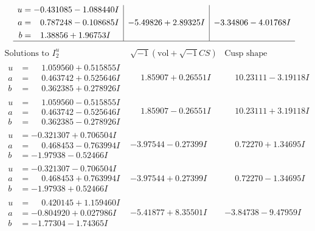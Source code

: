 \documentclass[1p]{elsarticle_modified}
\theoremstyle{definition}
\newcommand{\I}{\sqrt{-1}}
\begin{document}
$$\begin{array}{c|c|c}
\begin{aligned}
u &= -0.431085 - 1.088440 I \\
a &= \phantom{-}0.787248 - 0.108685 I \\
b &= \phantom{-}1.38856 + 1.96753 I\end{aligned}
 & -5.49826 + 2.89325 I & -3.34806 - 4.01768 I\\
 \hline 
 \end{array}$$\newpage$$\begin{array}{c|c|c}  
\text{Solutions to }I^u_{2}& \I (\text{vol} + \sqrt{-1}CS) & \text{Cusp shape}\\
 \hline 
\begin{aligned}
u &= \phantom{-}1.059560 + 0.515855 I \\
a &= \phantom{-}0.463742 + 0.525646 I \\
b &= \phantom{-}0.362385 + 0.278926 I\end{aligned}
 & \phantom{-}1.85907 + 0.26551 I & \phantom{-}10.23111 - 3.19118 I \\ \hline\begin{aligned}
u &= \phantom{-}1.059560 - 0.515855 I \\
a &= \phantom{-}0.463742 - 0.525646 I \\
b &= \phantom{-}0.362385 - 0.278926 I\end{aligned}
 & \phantom{-}1.85907 - 0.26551 I & \phantom{-}10.23111 + 3.19118 I \\ \hline\begin{aligned}
u &= -0.321307 + 0.706504 I \\
a &= \phantom{-}0.468453 - 0.763994 I \\
b &= -1.97938 - 0.52466 I\end{aligned}
 & -3.97544 - 0.27399 I & \phantom{-}0.72270 + 1.34695 I \\ \hline\begin{aligned}
u &= -0.321307 - 0.706504 I \\
a &= \phantom{-}0.468453 + 0.763994 I \\
b &= -1.97938 + 0.52466 I\end{aligned}
 & -3.97544 + 0.27399 I & \phantom{-}0.72270 - 1.34695 I \\ \hline\begin{aligned}
u &= \phantom{-}0.420145 + 1.159460 I \\
a &= -0.804920 + 0.027986 I \\
b &= -1.77304 - 1.74365 I\end{aligned}
 & -5.41877 + 8.35501 I & -3.84738 - 9.47959 I \\ \hline\begin{aligned}

\end{aligned}
\end{array}$$
\end{document}
